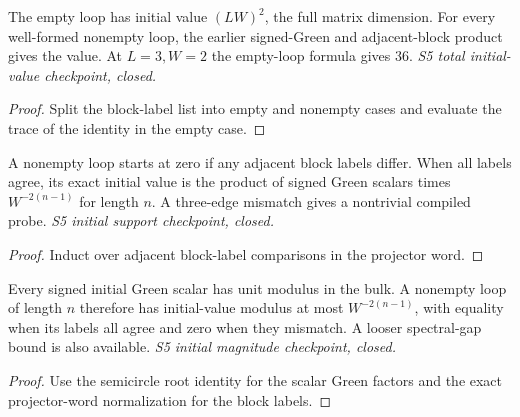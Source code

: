 \begin{lemma}
  \label{lem:loop-initial-total}
  \leanok
  The empty loop has initial value $(LW)^2$, the full matrix dimension.
  For every well-formed nonempty loop, the earlier signed-Green and
  adjacent-block product gives the value. At $L=3,W=2$ the empty-loop
  formula gives $36$. \emph{S5 total initial-value checkpoint, closed.}
\end{lemma}
\begin{proof}\leanok
  Split the block-label list into empty and nonempty cases and evaluate
  the trace of the identity in the empty case.
\end{proof}

\begin{lemma}
  \label{lem:loop-initial-support}
  \leanok
  A nonempty loop starts at zero if any adjacent block labels differ.
  When all labels agree, its exact initial value is the product of signed
  Green scalars times $W^{-2(n-1)}$ for length $n$. A three-edge mismatch
  gives a nontrivial compiled probe. \emph{S5 initial support checkpoint, closed.}
\end{lemma}
\begin{proof}\leanok
  Induct over adjacent block-label comparisons in the projector word.
\end{proof}

\begin{lemma}
  \label{lem:loop-initial-bound}
  \leanok
  Every signed initial Green scalar has unit modulus in the bulk.
  A nonempty loop of length $n$ therefore has initial-value modulus at
  most $W^{-2(n-1)}$, with equality when its labels all agree and zero
  when they mismatch. A looser spectral-gap bound is also available.
  \emph{S5 initial magnitude checkpoint, closed.}
\end{lemma}
\begin{proof}\leanok
  Use the semicircle root identity for the scalar Green factors and the
  exact projector-word normalization for the block labels.
\end{proof}

